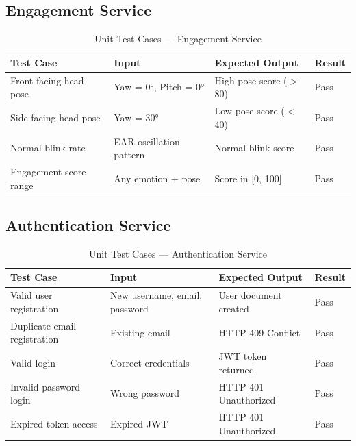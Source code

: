 \subsection{Engagement Service}

\begin{table}[H]
\centering
\caption{Unit Test Cases — Engagement Service}
\begin{tabular}{p{} p{} p{} l}
\toprule
\textbf{Test Case}          & \textbf{Input}                  & \textbf{Expected Output}  & \textbf{Result} \\
\midrule
Front-facing head pose      & Yaw = 0°, Pitch = 0°            & High pose score ($>$80)   & Pass \\
Side-facing head pose       & Yaw = 30°                       & Low pose score ($<$40)    & Pass \\
Normal blink rate           & EAR oscillation pattern         & Normal blink score        & Pass \\
Engagement score range      & Any emotion + pose              & Score in [0, 100]         & Pass \\
\bottomrule
\end{tabular}
\end{table}

\subsection{Authentication Service}

\begin{table}[H]
\centering
\caption{Unit Test Cases — Authentication Service}
\begin{tabular}{p{} p{} p{} l}
\toprule
\textbf{Test Case}          & \textbf{Input}             & \textbf{Expected Output}    & \textbf{Result} \\
\midrule
Valid user registration     & New username, email, password & User document created     & Pass \\
Duplicate email registration & Existing email             & HTTP 409 Conflict           & Pass \\
Valid login                 & Correct credentials        & JWT token returned          & Pass \\
Invalid password login      & Wrong password             & HTTP 401 Unauthorized       & Pass \\
Expired token access        & Expired JWT                & HTTP 401 Unauthorized       & Pass \\
\bottomrule
\end{tabular}
\end{table}

